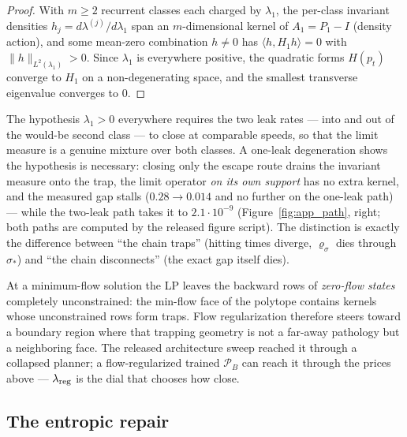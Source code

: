 \begin{proof}
With $m\geq2$ recurrent classes each charged by $\lambda_1$, the per-class invariant
densities $h_j = d\lambda^{(j)}/d\lambda_1$ span an $m$-dimensional kernel of $A_1 = P_1-I$
(density action), and some mean-zero combination $h\neq0$ has
$\langle h, H_1h\rangle=0$ with $\|h\|_{L^2(\lambda_1)}>0$. Since $\lambda_1$ is
everywhere positive, the quadratic forms $H(p_t)$ converge to $H_1$ on a
non-degenerating space, and the smallest transverse eigenvalue converges to $0$.
\end{proof}

\begin{remark}\label{rem:one_leak}
The hypothesis $\lambda_1>0$ everywhere requires the two leak rates --- into and out of
the would-be second class --- to close at comparable speeds, so that the limit measure is
a genuine mixture over both classes. A one-leak degeneration shows the hypothesis is
necessary: closing only the escape route drains the invariant measure onto the trap, the
limit operator \emph{on its own support} has no extra kernel, and the measured gap
stalls ($0.28\to0.014$ and no further on the one-leak path) --- while the two-leak path
takes it to $2.1\cdot10^{-9}$ (Figure~\ref{fig:app_path}, right; both paths are computed
by the released figure script). The distinction is exactly the
difference between ``the chain traps'' (hitting times diverge, $\varrho_\sigma$ dies
through $\sigma_*$) and ``the chain disconnects'' (the exact gap itself dies).
\end{remark}

\begin{remark}\label{rem:lp_degeneracy}
At a minimum-flow solution the LP leaves the backward rows of \emph{zero-flow states}
completely unconstrained: the min-flow face of the polytope contains kernels whose
unconstrained rows form traps. Flow regularization therefore steers toward a boundary
region where that trapping geometry is not a far-away pathology but a neighboring face.
The released architecture sweep reached it through a collapsed planner; a
flow-regularized trained $\mathcal P_B$ can reach it through the prices above ---
$\lambda_{\mathrm{reg}}$ is the dial that chooses how close.
\end{remark}

\subsection{The entropic repair}\label{sec:entropic}


